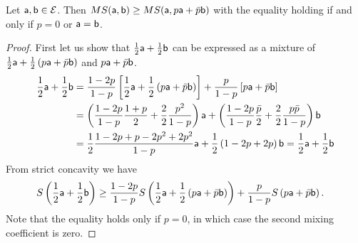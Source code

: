 \begin{mathSection}
\begin{prop}
	Let $\ens[a], \ens[b] \in \Ens$. Then $MS(\ens[a], \ens[b]) \geq MS(\ens[a], p\ens[a]+\bar{p}\ens[b])$ with the equality holding if and only if $p=0$ or $\ens[a] = \ens[b]$.
\end{prop}

\begin{proof}
	First let us show that $\frac{1}{2} \ens[a] + \frac{1}{2} \ens[b]$ can be expressed as a mixture of $\frac{1}{2} \ens[a] + \frac{1}{2}\left(p\ens[a] + \bar{p} \ens[b]\right)$ and $p\ens[a] + \bar{p} \ens[b]$.
	\begin{equation}
		\begin{aligned}
			\frac{1}{2} \ens[a] + \frac{1}{2} \ens[b] &=  \frac{1-2p}{1-p}\left[\frac{1}{2} \ens[a] + \frac{1}{2}\left(p\ens[a] + \bar{p} \ens[b]\right)\right] + \frac{p}{1-p}\left[p\ens[a] + \bar{p} \ens[b]\right] \\
			&= \left( \frac{1-2p}{1-p} \frac{1+p}{2} + \frac{2}{2} \frac{p^2}{1-p} \right) \ens[a] + \left( \frac{1-2p}{1-p} \frac{\bar{p}}{2}+ \frac{2}{2} \frac{p\bar{p}}{1-p} \right) \ens[b] \\
			&= \frac{1}{2} \frac{1-2p + p - 2p^2 + 2p^2}{1-p} \ens[a] + \frac{1}{2}\left(1-2p+2p\right) \ens[b] = \frac{1}{2} \ens[a] + \frac{1}{2} \ens[b]
		\end{aligned}
	\end{equation}
	From strict concavity we have
	\begin{equation}
		\begin{aligned}
			S\left(\frac{1}{2} \ens[a] + \frac{1}{2} \ens[b] \right) &\geq  \frac{1-2p}{1-p}S\left(\frac{1}{2} \ens[a] + \frac{1}{2}\left(p\ens[a] + \bar{p} \ens[b]\right)\right) + \frac{p}{1-p} S\left(p\ens[a] + \bar{p} \ens[b]\right).
		\end{aligned}
	\end{equation}
	Note that the equality holds only if $p=0$, in which case the second mixing coefficient is zero.
	

\end{proof}
\end{mathSection}

